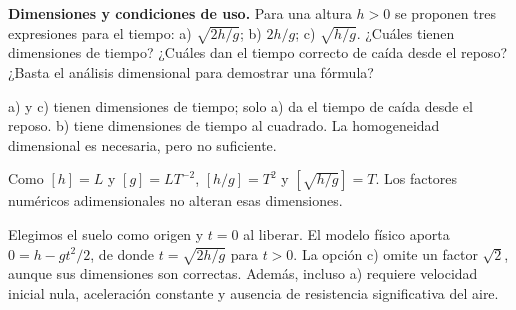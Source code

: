 \begin{ejercicio}
\textbf{Dimensiones y condiciones de uso.} Para una altura \(h>0\) se proponen tres expresiones para el tiempo: a) \(\sqrt{2h/g}\); b) \(2h/g\); c) \(\sqrt{h/g}\). ¿Cuáles tienen dimensiones de tiempo? ¿Cuáles dan el tiempo correcto de caída desde el reposo? ¿Basta el análisis dimensional para demostrar una fórmula?
\end{ejercicio}
\begin{respuesta}
a) y c) tienen dimensiones de tiempo; solo a) da el tiempo de caída desde el reposo. b) tiene dimensiones de tiempo al cuadrado. La homogeneidad dimensional es necesaria, pero no suficiente.
\end{respuesta}
\begin{explicacion}
Como \([h]=L\) y \([g]=LT^{-2}\), \([h/g]=T^2\) y \([\sqrt{h/g}]=T\). Los factores numéricos adimensionales no alteran esas dimensiones.

Elegimos el suelo como origen y \(t=0\) al liberar. El modelo físico aporta \(0=h-gt^2/2\), de donde \(t=\sqrt{2h/g}\) para \(t>0\). La opción c) omite un factor \(\sqrt{2}\), aunque sus dimensiones son correctas. Además, incluso a) requiere velocidad inicial nula, aceleración constante y ausencia de resistencia significativa del aire.
\end{explicacion}

\nivelintermedio

